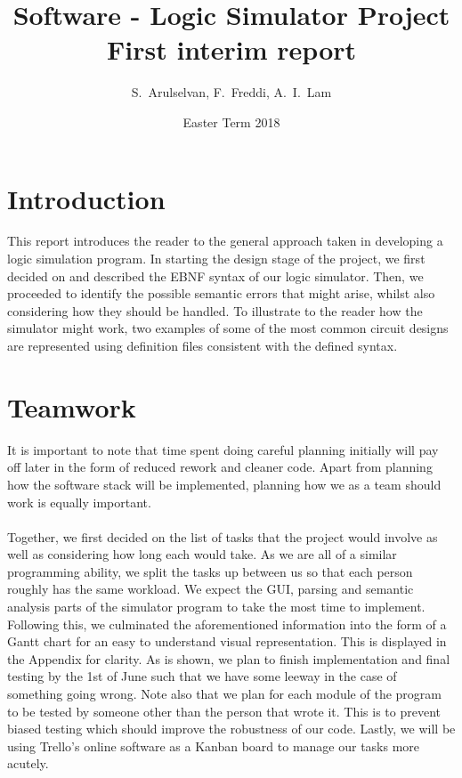 \documentclass[a4paper,11pt]{article}
\numberwithin{equation}{section}
\begin{document}
	\title{%
		\textbf{Software - Logic Simulator Project
		} \\
		\Large First interim report\\
	}
	\date{Easter Term 2018}
	\author{S.~Arulselvan, F.~Freddi, A.~I.~Lam}
	\maketitle
	\thispagestyle{fancy}
	
	
	\lstset{aboveskip=\medskipamount}
	
	\section{Introduction}
This report introduces the reader to the general approach taken in developing a logic simulation program. In starting the design stage of the project, we first decided on and described the EBNF syntax of our logic simulator. Then, we proceeded to identify the possible semantic errors that might arise, whilst also considering how they should be handled. To illustrate to the reader how the simulator might work, two examples of some of the most common circuit designs are represented using definition files consistent with the defined syntax. 

\section{Teamwork}

It is important to note that time spent doing careful planning initially will pay off later in the form of reduced rework and cleaner code. Apart from planning how the software stack will be implemented, planning how we as a team should work is equally important.
\\\\
Together, we first decided on the list of tasks that the project would involve as well as considering how long each would take. As we are all of a similar programming ability, we split the tasks up between us so that each person roughly has the same workload. We expect the GUI, parsing and semantic analysis parts of the simulator program to take the most time to implement. Following this, we culminated the aforementioned information into the form of a Gantt chart for an easy to understand visual representation. This is displayed in the Appendix for clarity. As is shown, we plan to finish implementation and final testing by the 1st of June such that we have some leeway in the case of something going wrong. Note also that we plan for each module of the program to be tested by someone other than the person that wrote it. This is to prevent biased testing which should improve the robustness of our code. Lastly, we will be using Trello's online software as a Kanban board to manage our tasks more acutely. 
\end{document}
